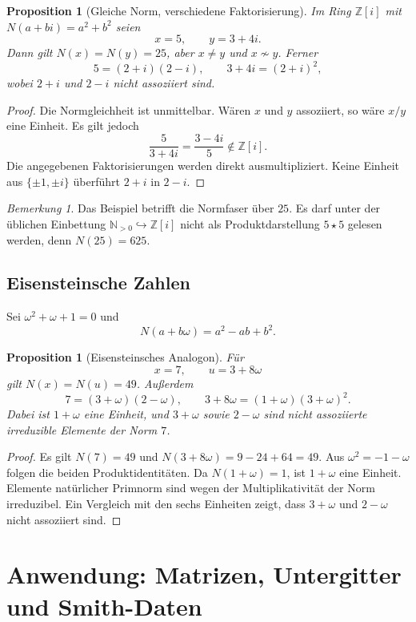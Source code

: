 \documentclass[11pt,a4paper,reqno]{amsart}
\newtheorem{proposition}[theorem]{Proposition}
\theoremstyle{definition}
\theoremstyle{remark}
\newtheorem{remark}[theorem]{Bemerkung}
\newcommand{\Npos}{\mathbb{N}_{>0}}
\newcommand{\Z}{\mathbb{Z}}
\begin{document}
\begin{proposition}[Gleiche Norm, verschiedene Faktorisierung]
Im Ring $\Z[i]$ mit $N(a+bi)=a^2+b^2$ seien
\[
  x=5,
  \qquad y=3+4i.
\]
Dann gilt $N(x)=N(y)=25$, aber $x\neq y$ und $x\not\sim y$. Ferner
\[
  5=(2+i)(2-i),
  \qquad
  3+4i=(2+i)^2,
\]
wobei $2+i$ und $2-i$ nicht assoziiert sind.
\end{proposition}

\begin{proof}
Die Normgleichheit ist unmittelbar. Wären $x$ und $y$ assoziiert, so wäre $x/y$ eine Einheit. Es gilt jedoch
\[
  \frac{5}{3+4i}=\frac{3-4i}{5}\notin\Z[i].
\]
Die angegebenen Faktorisierungen werden direkt ausmultipliziert. Keine Einheit aus $\{\pm1,\pm i\}$ überführt $2+i$ in $2-i$.
\end{proof}

\begin{remark}
Das Beispiel betrifft die Normfaser über $25$. Es darf unter der üblichen Einbettung $\Npos\hookrightarrow\Z[i]$ nicht als Produktdarstellung $5\star5$ gelesen werden, denn $N(25)=625$.
\end{remark}

\subsection{Eisensteinsche Zahlen}

Sei $\omega^2+\omega+1=0$ und
\[
  N(a+b\omega)=a^2-ab+b^2.
\]

\begin{proposition}[Eisensteinsches Analogon]
Für
\[
  x=7,
  \qquad u=3+8\omega
\]
gilt $N(x)=N(u)=49$. Außerdem
\[
  7=(3+\omega)(2-\omega),
  \qquad
  3+8\omega=(1+\omega)(3+\omega)^2.
\]
Dabei ist $1+\omega$ eine Einheit, und $3+\omega$ sowie $2-\omega$ sind nicht assoziierte irreduzible Elemente der Norm $7$.
\end{proposition}

\begin{proof}
Es gilt $N(7)=49$ und $N(3+8\omega)=9-24+64=49$. Aus $\omega^2=-1-\omega$ folgen die beiden Produktidentitäten. Da $N(1+\omega)=1$, ist $1+\omega$ eine Einheit. Elemente natürlicher Primnorm sind wegen der Multiplikativität der Norm irreduzibel. Ein Vergleich mit den sechs Einheiten zeigt, dass $3+\omega$ und $2-\omega$ nicht assoziiert sind.
\end{proof}

\section{Anwendung: Matrizen, Untergitter und Smith-Daten}
\label{sec:matrices}
\end{document}
